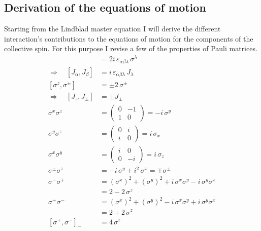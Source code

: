 \begin{appendices}

    \section{Derivation of the equations of motion}
    \label{appendix:eqm_derv}
    
    Starting from the Lindblad master equation I will derive the different interaction's contributions to the equations of motion for the components of the collective spin. For this purpose I
    revise a few of the properties of Pauli matrices.
    \begin{align*}
        [\sigma^\alpha,\sigma^\beta]&=2i\,\varepsilon_{\alpha\beta\lambda}\,\sigma^\lambda\\
        \Rightarrow\quad[J_\alpha,J_\beta]&=i\,\varepsilon_{\alpha\beta\lambda}\,J_\lambda\\
        [\sigma^z,\sigma^\pm]&=\pm2\,\sigma^\pm\\
        \Rightarrow\quad[J_z,J_\pm]&=\pm J_\pm\\
        \sigma^x\sigma^z&=\left( \begin{array}{cc}
             0 & -1  \\
             1& 0
        \end{array}\right)=-i\,\sigma^y\\
        \sigma^y\sigma^z&=\left( \begin{array}{cc}
             0 & i  \\
             i& 0
        \end{array}\right)=i\,\sigma_x\\
        \sigma^x\sigma^y&=\left( \begin{array}{cc}
             i & 0  \\
             0 & -i
        \end{array}\right)=i\,\sigma_z\\
        \sigma^\pm\sigma^z&=-i\,\sigma^y\pm i^2\,\sigma^x=\mp\sigma^\pm\\
        \sigma^-\sigma^+&=(\sigma^x)^2+(\sigma^y)^2+i\,\sigma^x\sigma^y-i\,\sigma^y\sigma^x\\
        &=2-2\,\sigma^z\\
        \sigma^+\sigma^-&=(\sigma^x)^2+(\sigma^y)^2-i\,\sigma^x\sigma^y+i\,\sigma^y\sigma^x\\
        &=2+2\,\sigma^z\\
        [\sigma^+,\sigma^-]_-&=4\,\sigma^z
    \end{align*}

\end{appendices}
